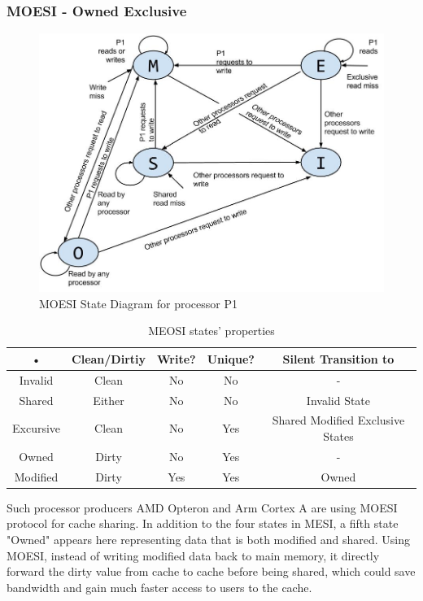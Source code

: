 \subsubsection{MOESI - Owned Exclusive}
\begin{figure}[h!]
    \centering
    \includegraphics[width=1\textwidth]{img/MOESIstatediagram.jpg}
    \caption{MOESI State Diagram for processor P1}
    \label{fig:MOESIstatediagram}
\end{figure}

\begin{table}[position specifier]
\centering
\begin{tabular}{|c|c|c|c|c|}
\hline 
• & Clean/Dirtiy & Write? & Unique? & Silent Transition to \\ 
\hline 
Invalid & Clean & No & No & - \\ 
\hline 
Shared & Either & No & No & Invalid State \\ 
\hline 
Excursive & Clean & No & Yes & Shared Modified Exclusive States \\ 
\hline 
Owned & Dirty & No & Yes & - \\ 
\hline 
Modified & Dirty & Yes & Yes & Owned \\ 
\hline 
\end{tabular} 
\caption{MEOSI states' properties}
\label{tab:MSItable}
\end{table}

Such processor producers AMD Opteron and Arm Cortex A are using MOESI protocol for cache sharing. In addition to the four states in MESI, a fifth state "Owned" appears here representing data that is both modified and shared. Using MOESI, instead of writing modified data back to main memory, it directly forward the dirty value from cache to cache before being shared, which could save bandwidth and gain much faster access to users to the cache.

